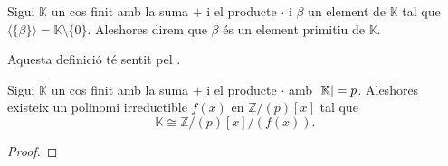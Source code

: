 \documentclass[../Apunts.tex]{subfiles}
\begin{document}
	\begin{definition}
		\label{def:element primitiu d'un cos finit}
		Sigui \(\mathbb{K}\) un cos finit amb la suma \(+\) i el producte \(\cdot\) i \(\beta\) un element de \(\mathbb{K}\) tal que \(\langle\{\beta\}\rangle=\mathbb{K}\setminus\{0\}\). Aleshores direm que \(\beta\) és un element primitiu de \(\mathbb{K}\).
		
		Aquesta definició té sentit pel .
	\end{definition}
	\begin{theorem}
		Sigui \(\mathbb{K}\) un cos finit amb la suma \(+\) i el producte \(\cdot\) amb \(\abs{\mathbb{K}}=p\). Aleshores existeix un polinomi irreductible \(f(x)\) en \(\mathbb{Z}/(p)[x]\) tal que
		\[\mathbb{K}\cong\mathbb{Z}/(p)[x]/(f(x)).\]
		\begin{proof}
		\end{proof}
	\end{theorem}
\end{document}

